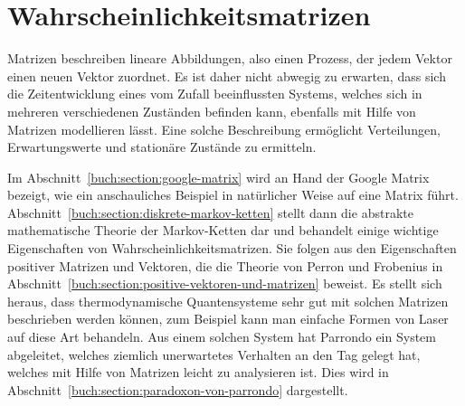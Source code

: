 %
%
%
\chapter{Wahrscheinlichkeitsmatrizen
\label{buch:chapter:wahrscheinlichkeit}}
\rhead{}
Matrizen beschreiben lineare Abbildungen, also einen Prozess, der
jedem Vektor einen neuen Vektor zuordnet.
Es ist daher nicht abwegig zu erwarten, dass sich 
die Zeitentwicklung eines vom Zufall beeinflussten Systems, welches sich
in mehreren verschiedenen Zuständen befinden kann, ebenfalls mit Hilfe
von Matrizen modellieren lässt.
Eine solche Beschreibung ermöglicht Verteilungen,
Erwartungswerte und stationäre Zustände zu ermitteln.

Im Abschnitt~\ref{buch:section:google-matrix} wird an Hand der Google
Matrix bezeigt, wie ein anschauliches Beispiel in natürlicher Weise
auf eine Matrix führt.
Abschnitt~\ref{buch:section:diskrete-markov-ketten} stellt dann die abstrakte
mathematische Theorie der Markov-Ketten dar und behandelt einige wichtige
Eigenschaften von Wahrscheinlichkeitsmatrizen.
Sie folgen aus den Eigenschaften positiver Matrizen und Vektoren, 
die die Theorie von Perron und Frobenius in
Abschnitt~\ref{buch:section:positive-vektoren-und-matrizen}
beweist.
Es stellt sich heraus, dass thermodynamische Quantensysteme sehr gut
mit solchen Matrizen beschrieben werden können, zum Beispiel kann man
einfache Formen von Laser auf diese Art behandeln.
Aus einem solchen System hat Parrondo ein System abgeleitet, welches 
ziemlich unerwartetes Verhalten an den Tag gelegt hat, welches mit
Hilfe von Matrizen leicht zu analysieren ist. 
Dies wird in Abschnitt~\ref{buch:section:paradoxon-von-parrondo}
dargestellt.





